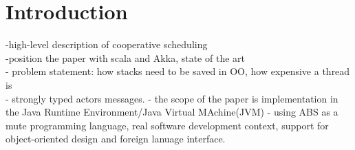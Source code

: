 \section{Introduction}

-high-level description of cooperative scheduling\\
-position the paper with scala and Akka, state of the art\\
- problem statement: how stacks need to be saved in OO, how expensive a thread is\\
- strongly typed actors messages.
- the scope of the paper is implementation in the Java Runtime Environment/Java Virtual MAchine(JVM)
- using ABS as a mute programming language, real software development context, support for object-oriented design and foreign lanuage interface.